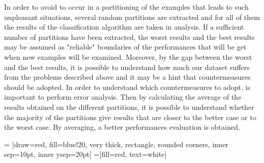 \documentclass[aps,letterpaper,10pt]{revtex4}
\begin{document}
In order to avoid to occur in a partitioning of the examples that leads to such unpleasant situations, several random partitions are extracted and for all of them the results of the classification algorithm are taken in analysis. If a sufficient number of partitions have been extracted, the worst results and the best results may be assumed as "reliable" boundaries of the performances that will be get when new examples will be examined. Moreover, by the gap between the worst and the best results, it is possible to understand how much our dataset suffers from the problems described above and it may be a hint that countermeasures should be adopted. In order to understand which countermeasures to adopt, is important to perform error analysis. Then by calculating the average of the results obtained on the different partitions, it is possible to understand whether the majority of the partitions give results that are closer to the better case or to the worst case. By averaging, a better performances evaluation is obtained.

 = [draw=red, fill=blue!20, very thick,
    rectangle, rounded corners, inner sep=10pt, inner ysep=20pt]
 =[fill=red, text=white]

%
\end{document}

